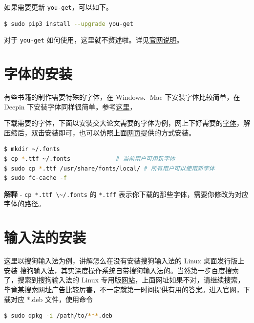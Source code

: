 \documentclass[doctor,openright,twoside]{sjtuthesis}
\newcommand{\passthrough}[1]{#1}
\theoremstyle{plain}
\theoremstyle{definition}
\theoremstyle{remark}
\theoremstyle{ocrenumbox}
\theoremstyle{plain}
\begin{document}
如果需要更新 \passthrough{\lstinline!you-get!}，可以如下。

\begin{lstlisting}[language=bash]
$ sudo pip3 install --upgrade you-get
\end{lstlisting}

对于 \passthrough{\lstinline!you-get!} 如何使用，这里就不赘述啦。详见\href{https://github.com/soimort/you-get}{官网说明}。

\hypertarget{section-114}{%
\section{字体的安装}\label{section-114}}

有些书籍的制作需要特殊的字体，在 Windows、Mac 下安装字体比较简单，在 Deepin 下安装字体同样很简单。参考\href{https://github.com/weijianwen/SJTUThesis/blob/master/tex/app_setup.tex}{这里}，

下载需要的字体，下面以安装交大论文需要的字体为例，网上下好需要的\href{http://download.csdn.net/download/bubifengyun/9695994}{字体}，解压缩后，双击安装即可，也可以仿照上面\href{https://github.com/weijianwen/SJTUThesis/blob/master/tex/app_setup.tex}{网页}提供的方式安装。

\begin{lstlisting}[language=bash]
$ mkdir ~/.fonts
$ cp *.ttf ~/.fonts             # 当前用户可用新字体
$ sudo cp *.ttf /usr/share/fonts/local/ # 所有用户可以使用新字体
$ sudo fc-cache -f
\end{lstlisting}

\textbf{解释}
- \passthrough{\lstinline!cp *.ttf \~/.fonts!} 的 \passthrough{\lstinline!*.tff!} 表示你下载的那些字体，需要你修改为对应字体的路径。

\hypertarget{section-115}{%
\section{输入法的安装}\label{section-115}}

这里以搜狗输入法为例，讲解怎么在没有安装搜狗输入法的 Linux 桌面发行版上安装 搜狗输入法，其实深度操作系统自带搜狗输入法的。当然第一步百度搜索了，搜索到搜狗输入法的 Linux 专用版\href{http://pinyin.sogou.com/linux/}{网站}，上面网址如果不对，请继续搜索，毕竟某搜索网址广告比较厉害，不一定就第一时间提供有用的答案。进入官网，下载对应 *.deb 文件，使用命令

\begin{lstlisting}[language=bash]
$ sudo dpkg -i /path/to/***.deb
\end{lstlisting}
\end{document}
